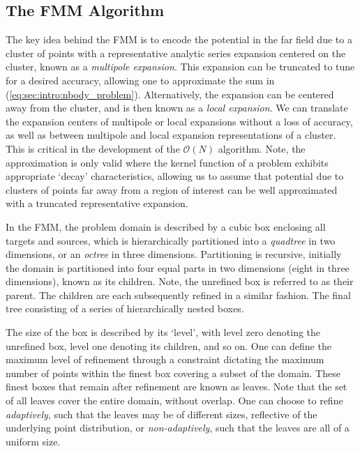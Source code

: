 \documentclass{IEEEcsmag}
\begin{document}
\subsection{The FMM Algorithm}\label{sec:intro:algorithm}

The key idea behind the FMM is to encode the potential in the far field due to a cluster of points with a representative analytic series expansion centered on the cluster, known as a \textit{multipole expansion}. This expansion can be truncated to tune for a desired accuracy, allowing one to approximate the sum in (\ref{eq:sec:intro:nbody_problem}). Alternatively, the expansion can be centered away from the cluster, and is then known as a \textit{local expansion}. We can translate the expansion centers of multipole or local expansions without a loss of accuracy, as well as between multipole and local expansion representations of a cluster. This is critical in the development of the $\mathcal{O}(N)$ algorithm. Note, the approximation is only valid where the kernel function of a problem exhibits appropriate `decay' characteristics, allowing us to assume that potential due to clusters of points far away from a region of interest can be well approximated with a truncated representative expansion.

In the FMM, the problem domain is described by a cubic box enclosing all targets and sources, which is hierarchically partitioned into a \textit{quadtree} in two dimensions, or an \textit{octree} in three dimensions. Partitioning is recursive, initially the domain is partitioned into four equal parts in two dimensions (eight in three dimensions), known as its children. Note, the unrefined box is referred to as their parent. The children are each subsequently refined in a similar fashion. The final tree consisting of a series of hierarchically nested boxes.

The size of the box is described by its `level', with level zero denoting the unrefined box, level one denoting its children, and so on. One can define the maximum level of refinement through a  constraint dictating the maximum number of points within the finest box covering a subset of the domain. These finest boxes that remain after refinement are known as leaves. Note that the set of all leaves cover the entire domain, without overlap. One can choose to refine \textit{adaptively}, such that the leaves may be of different sizes, reflective of the underlying point distribution, or \textit{non-adaptively}, such that the leaves are all of a uniform size.
\end{document}
